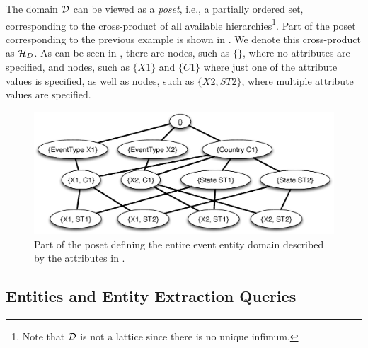 The domain $\mathcal{D}$ can be viewed as a {\em poset}, i.e., a partially ordered set, corresponding to the cross-product of all available hierarchies\footnote{Note that $\mathcal{D}$ is not a lattice since there is no unique infimum.}. Part of the poset corresponding to the previous example is shown in . We denote this cross-product as $\mathcal{H}_D$. As can be seen in , there are nodes, such as $\{\}$, where no attributes are specified, and nodes, such as $\{X1\}$ and $\{C1\}$ where just one of the attribute values is specified, as well as nodes, such as $\{X2, ST2\}$, where multiple attribute values are specified.




\begin{figure}[h]
\vspace{-10pt}
	\begin{center}
	\includegraphics[clip,scale=0.32]{figs/eventsExLattice.eps}
	\vspace{-10pt}
	\caption{Part of the poset defining the entire event entity domain described by the attributes in .}
	\label{fig:eventslattice}
	\end{center}
	\vspace{-20pt}
\end{figure}


\subsection{Entities and Entity Extraction Queries}
\label{sec:queries}

